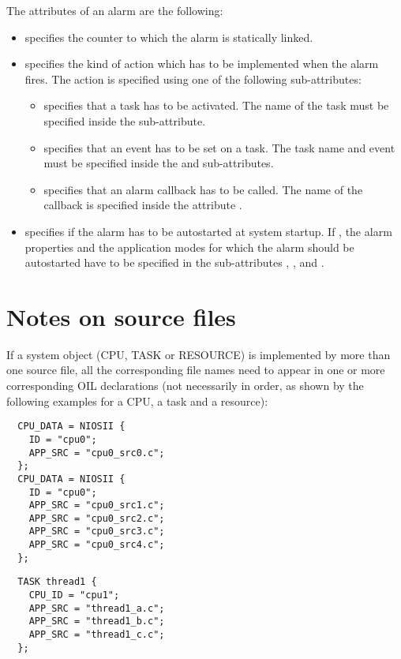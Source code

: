 The attributes of an alarm are the following:
\begin{itemize}
\item {} specifies the counter to which the alarm is
  statically linked.
\item {} specifies the kind of action which has to be
  implemented when the alarm fires. The action is specified using one
  of the following sub-attributes:
  \begin{itemize}
  \item {} specifies that a task has to be
    activated. The name of the task must be specified inside the
     sub-attribute.
  \item {} specifies that an event has to be set on a
    task. The task name and event must be specified inside the
     and  sub-attributes.
  \item {} specifies that an alarm callback has to
    be called. The name of the callback is specified inside the
    attribute .
  \end{itemize}
\item {} specifies if the alarm has to be autostarted
  at system startup. If , the alarm properties and the
  application modes for which the alarm should be autostarted have to be
  specified in the sub-attributes , ,
  and .
\end{itemize}

\section{Notes on source files}

If a system object (CPU, TASK or RESOURCE) is implemented by more than
one source file, all the corresponding file names need to appear in
one or more corresponding OIL declarations (not necessarily in order,
as shown by the following examples for a CPU, a task and a resource):

\begin{lstlisting}
  CPU_DATA = NIOSII {
    ID = "cpu0";
    APP_SRC = "cpu0_src0.c";
  };
  CPU_DATA = NIOSII {
    ID = "cpu0";
    APP_SRC = "cpu0_src1.c";
    APP_SRC = "cpu0_src2.c";
    APP_SRC = "cpu0_src3.c";
    APP_SRC = "cpu0_src4.c";
  };
\end{lstlisting}

\begin{lstlisting}
  TASK thread1 {
    CPU_ID = "cpu1";
    APP_SRC = "thread1_a.c";
    APP_SRC = "thread1_b.c";
    APP_SRC = "thread1_c.c";
  };
\end{lstlisting}

